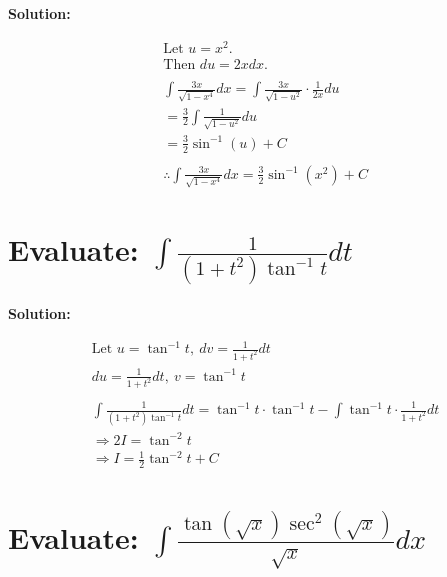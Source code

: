 \documentclass{article}
\begin{document}
\textbf{Solution:}

\begin{align*}
     & \text{Let } u = x^2.                                                                     \\
     & \text{Then } du = 2x dx.                                                                 \\
    \\
     & \int \frac{3x}{\sqrt{1 - x^4}} dx = \int \frac{3x}{\sqrt{1 - u^2}} \cdot \frac{1}{2x} du \\
     & = \frac{3}{2} \int \frac{1}{\sqrt{1 - u^2}} du                                           \\
     & = \frac{3}{2} \sin^{-1}(u) + C                                                           \\
    \\
     & \therefore \int \frac{3x}{\sqrt{1 - x^4}} dx = {\frac{3}{2} \sin^{-1}(x^2) + C}
\end{align*}

\newpage
\section{Evaluate: $\int \frac{1}{(1+t^2) \tan^{-1}t} dt$}

\textbf{Solution:}

\begin{align*}
     & \text{Let } u = \tan^{-1} t, \ dv = \frac{1}{1 + t^2} dt                                                              \\
     & du = \frac{1}{1 + t^2} dt, \ v = \tan^{-1} t                                                                          \\
    \\
     & \int \frac{1}{(1 + t^2) \tan^{-1} t} dt = \tan^{-1} t \cdot \tan^{-1} t - \int \tan^{-1} t \cdot \frac{1}{1 + t^2} dt \\
     & \Rightarrow 2I = \tan^{-2} t                                                                                          \\
     & \Rightarrow I = \frac{1}{2} \tan^{-2} t + C
\end{align*}

\section{Evaluate: $\int \frac{\tan(\sqrt{x}) \sec^2(\sqrt{x})}{\sqrt{x}} dx$}
\end{document}

